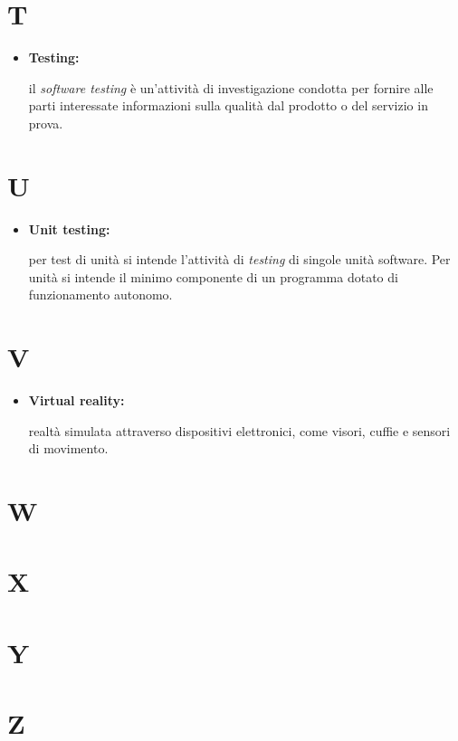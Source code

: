 \section*{T}

\begin{itemize}
	\item \hypertarget{test}{\textbf{Testing:}} il \textit{software testing} è un'attività di investigazione condotta per fornire alle parti interessate informazioni sulla qualità dal prodotto o del servizio in prova.
\end{itemize}

\section*{U}

\begin{itemize}
	\item \hypertarget{ut}{\textbf{Unit testing:}} per test di unità si intende l'attività di \textit{testing} di singole unità software. Per unità si intende il minimo componente di un programma dotato di funzionamento autonomo. 
\end{itemize}

\section*{V}

\begin{itemize}
	\item \hypertarget{vr}{\textbf{Virtual reality:}} realtà simulata attraverso dispositivi elettronici, come visori, cuffie e sensori di movimento.
\end{itemize}

\section*{W}

\section*{X}

\section*{Y}

\section*{Z}